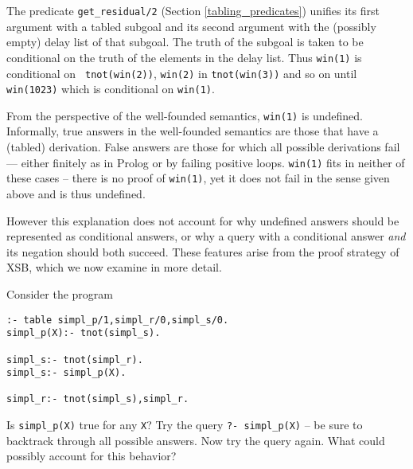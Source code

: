The predicate {\tt get\_residual/2} (Section \ref{tabling_predicates})
unifies its first argument with a tabled subgoal and its second
argument with the (possibly empty) delay list of that subgoal.  The
truth of the subgoal is taken to be conditional on the truth of the
elements in the delay list.  Thus {\tt win(1)} is conditional on {\tt
tnot(win(2))}, {\tt win(2)} in {\tt tnot(win(3))} and so on until {\tt
win(1023)} which is conditional on {\tt win(1)}.

From the perspective of the well-founded semantics, {\tt win(1)} is
undefined.  Informally, true answers in the well-founded semantics are
those that have a (tabled) derivation.  False answers are those for
which all possible derivations fail --- either finitely as in Prolog
or by failing positive loops.  {\tt win(1)} fits in neither of these
cases -- there is no proof of {\tt win(1)}, yet it does not fail in
the sense given above and is thus undefined.

However this explanation does not account for why undefined answers
should be represented as conditional answers, or why a query with a
conditional answer {\em and} its negation should both succeed.  These
features arise from the proof strategy of XSB, which we now examine in
more detail.

\begin{exercise} \label{ex:simpl}
Consider the program
\begin{verbatim}
:- table simpl_p/1,simpl_r/0,simpl_s/0.
simpl_p(X):- tnot(simpl_s).

simpl_s:- tnot(simpl_r).
simpl_s:- simpl_p(X).

simpl_r:- tnot(simpl_s),simpl_r.
\end{verbatim}
Is {\tt simpl\_p(X)} true for any {\tt X}?  Try the query {\tt ?-
simpl\_p(X)} -- be sure to backtrack through all possible answers.
Now try the query again.  What could possibly account for this
behavior?
\end{exercise}


